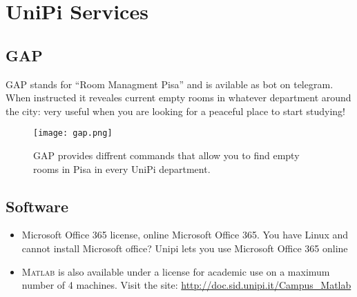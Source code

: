 \documentclass[11pt,fleqn,oneside]{book} %
\begin{document}

\chapter{UniPi Services}


\section{GAP}
GAP stands for ``Room Managment Pisa'' and is avilable as bot on telegram. When instructed it reveales current empty rooms in whatever department around the city: very useful when you are looking for a peaceful place to start studying!
\begin{figure}[h]
  \centering\texttt{[image: gap.png]}
  \caption{GAP provides diffrent commands that allow you to find empty rooms in Pisa in every UniPi department.}
\end{figure}


\section{Software}
\begin{itemize}
  \item Microsoft Office 365 license, online Microsoft Office 365. You have Linux and cannot install Microsoft office? Unipi lets you use Microsoft Office 365 online
  \item \textsc{Matlab} is also available under a license for academic use on a maximum number of 4 machines. Visit the site: \url{http://doc.sid.unipi.it/Campus_Matlab}
\end{itemize}  
\end{document}
